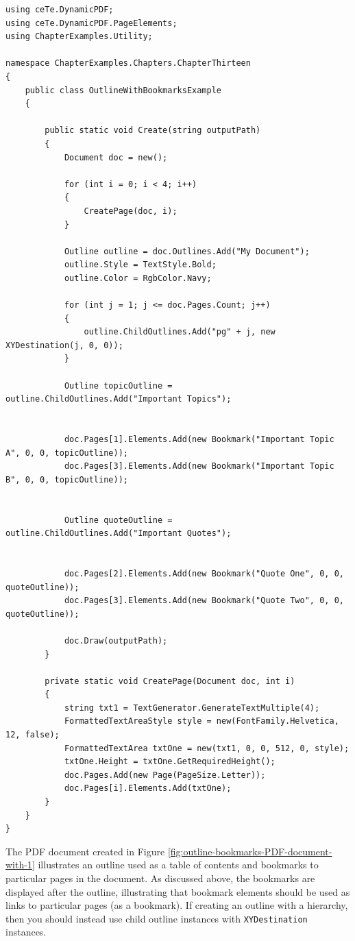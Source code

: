 \documentclass[american]{tufte-book}
\numberwithin{equation}{section}
\numberwithin{figure}{section}
\begin{document}
{\bgroup{}
\begin{lstlisting}[caption={Pdf with outline and bookmarks.},label={lis:outline-book-Pdf-document-with},basicstyle={\footnotesize\ttfamily},breaklines=true]
using ceTe.DynamicPDF;
using ceTe.DynamicPDF.PageElements;
using ChapterExamples.Utility;

namespace ChapterExamples.Chapters.ChapterThirteen
{
    public class OutlineWithBookmarksExample
    {

        public static void Create(string outputPath)
        {
            Document doc = new();

            for (int i = 0; i < 4; i++)
            {
                CreatePage(doc, i);
            }

            Outline outline = doc.Outlines.Add("My Document");
            outline.Style = TextStyle.Bold;
            outline.Color = RgbColor.Navy;

            for (int j = 1; j <= doc.Pages.Count; j++)
            {
                outline.ChildOutlines.Add("pg" + j, new XYDestination(j, 0, 0));
            }

            Outline topicOutline = outline.ChildOutlines.Add("Important Topics");


            doc.Pages[1].Elements.Add(new Bookmark("Important Topic A", 0, 0, topicOutline));
            doc.Pages[3].Elements.Add(new Bookmark("Important Topic B", 0, 0, topicOutline));


            Outline quoteOutline = outline.ChildOutlines.Add("Important Quotes");


            doc.Pages[2].Elements.Add(new Bookmark("Quote One", 0, 0, quoteOutline));
            doc.Pages[3].Elements.Add(new Bookmark("Quote Two", 0, 0, quoteOutline));

            doc.Draw(outputPath);
        }

        private static void CreatePage(Document doc, int i)
        {
            string txt1 = TextGenerator.GenerateTextMultiple(4);
            FormattedTextAreaStyle style = new(FontFamily.Helvetica, 12, false);
            FormattedTextArea txtOne = new(txt1, 0, 0, 512, 0, style);
            txtOne.Height = txtOne.GetRequiredHeight();
            doc.Pages.Add(new Page(PageSize.Letter));
            doc.Pages[i].Elements.Add(txtOne);
        }
    }
}
\end{lstlisting}
\leavevmode\egroup

The PDF document created in Figure \ref{fig:outline-bookmarks-PDF-document-with-1}
illustrates an outline used as a table of contents and bookmarks to
particular pages in the document. As discussed above, the bookmarks
are displayed after the outline, illustrating that bookmark elements
should be used as links to particular pages (as a bookmark). If creating
an outline with a hierarchy, then you should instead use child outline
instances with \texttt{XYDestination} instances.

}
\end{document}

